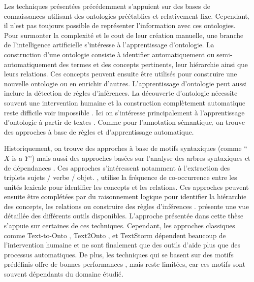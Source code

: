 Les techniques présentées précédemment s'appuient sur des bases de connaissances utilisant des ontologies préétablies et relativement fixe.
Cependant, il n'est pas toujours possible de représenter l'information avec ces ontologies.
Pour surmonter la complexité et le cout de leur création manuelle, une branche de l'intelligence artificielle s'intéresse à l'apprentissage d'ontologie.
La construction d'une ontologie consiste à identifier automatiquement ou semi-automatiquement des termes et des concepts pertinents, leur hiérarchie ainsi que leurs relations.
Ces concepts peuvent ensuite être utilisés pour construire une nouvelle ontologie ou en enrichir d'autres.
L'apprentissage d'ontologie peut aussi inclure la détection de règles d'inférences.
La découverte d'ontologie nécessite souvent une intervention humaine \cite{navarro-almanzaAutomatedOntologyExtraction2020} et la construction complètement automatique reste difficile voir impossible \cite{hazmanSurveyOntologyLearning2011,wongOntologyLearningText2012,browarnikOntologyLearningText2015}.
Ici on s'intéresse principalement à l'apprentissage d'ontologie à partir de textes \cite{konysKnowledgeRepositoryOntology2019,watrobskiOntologyLearningMethods2020,al-aswadiAutomaticOntologyConstruction2020}.
Comme pour l'annotation sémantique, on trouve des approches à base de règles et d'apprentissage automatique.

Historiquement, on trouve des approches à base de motifs syntaxiques (comme \enquote{$X$ is a $Y$}) \cite{morinAutomaticAcquisitionSemantic1999} mais aussi des approches basées sur l'analyse des arbres syntaxiques et de dépendances \cite{gamalloMappingSyntacticDependencies2002,nivreIncrementalityDeterministicDependency2004}.
Ces approches s'intéressent notamment à l'extraction des triplets sujets / verbe / objet.
\cite{budanitskyLexicalSemanticRelatedness1999}, utilise la fréquence de co-occurrence entre les unités lexicale pour identifier les concepts et les relations.
Ces approches peuvent ensuite être complétées par du raisonnement logique pour identifier la hiérarchie des concepts, les relations ou construire des règles d'inférences \cite{zelleLearningSemanticGrammars1993}.
\cite{al-aswadiAutomaticOntologyConstruction2020} présente une vue détaillée des différents outils disponibles.
L'approche présentée dans cette thèse s'appuie sur certaines de ces techniques.
Cependant, les approches classiques comme {Text-to-Onto} \cite{maedcheTexttoontoOntologyExtraction2001}, {Text2Onto} \cite{cimianoText2Onto2005}, et {TextStorm} \cite{alvesAutomaticReadingLearning2002} dépendent beaucoup de l'intervention humaine et ne sont finalement que des outils d'aide plus que des processus automatiques.
De plus, les techniques qui se basent sur des motifs prédéfinis offre de bonnes performances \cite{savaryRelationExtractionClinical2022}, mais reste limitées, car ces motifs sont souvent dépendants du domaine étudié.

